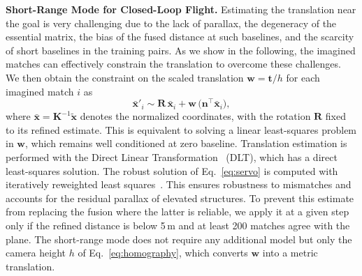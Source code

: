 \noindent\textbf{Short-Range Mode for Closed-Loop Flight.}\label{sec:servo}
Estimating the translation near the goal is very challenging due to the lack of parallax, the degeneracy of the essential matrix, the bias of the fused distance at such baselines, and the scarcity of short baselines in the training pairs. As we show in the following, the imagined matches can effectively constrain the translation to overcome these challenges. We then obtain the constraint on the scaled translation $\mathbf{w}=\mathbf{t}/h$ for each imagined match $i$ as
\begin{equation}
\bar{\mathbf{x}}'_i\sim\mathbf{R}\,\bar{\mathbf{x}}_i+\mathbf{w}\,\bigl(\mathbf{n}^{\top}\bar{\mathbf{x}}_i\bigr),
\label{eq:servo}
\end{equation}
where $\bar{\mathbf{x}}=\mathbf{K}^{-1}\tilde{\mathbf{x}}$ denotes the normalized coordinates, with the rotation $\mathbf{R}$ fixed to its refined estimate. This is equivalent to solving a linear least-squares problem in $\mathbf{w}$, which remains well conditioned at zero baseline. Translation estimation is performed with the Direct Linear Transformation~\citep{hartley2003multiple} (DLT), which has a direct least-squares solution. The robust solution of Eq.~\eqref{eq:servo} is computed with iteratively reweighted least squares~\citep{holland1977robust}. This ensures robustness to mismatches and accounts for the residual parallax of elevated structures. To prevent this estimate from replacing the fusion where the latter is reliable, we apply it at a given step only if the refined distance is below 5\,m and at least 200 matches agree with the plane. The short-range mode does not require any additional model but only the camera height $h$ of Eq.~\eqref{eq:homography}, which converts $\mathbf{w}$ into a metric translation.
